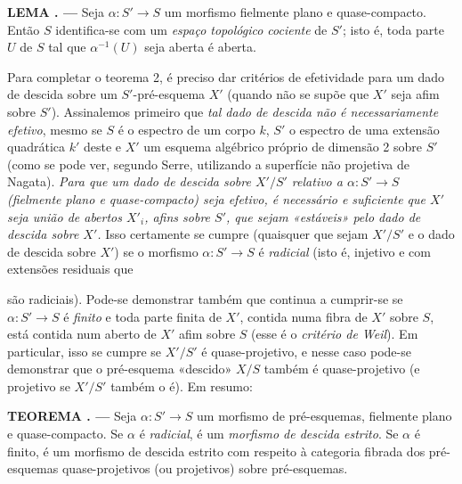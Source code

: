 \documentclass[11pt,twoside,openany]{book}
\numberwithin{equation}{section}
\newcommand{\src}[1]{%
  \phantomsection\hypertarget{src:#1}{}%
  \marginpar{\raggedleft\footnotesize\sffamily #1}%
}
\theoremstyle{plain}
\theoremstyle{definition}
\theoremstyle{remark}
\newcommand{\result}[2]{%
  \par\medskip\noindent\textbf{#1%
  \if\relax\detokenize{#2}\relax\else\space#2\fi. ---}\enspace
}
\newcommand{\FgaUnitKey}{frontmatter}
\renewcommand{\src}[1]{%
  \phantomsection\hypertarget{src:\FgaUnitKey:#1}{}%
  \marginpar{\raggedleft\footnotesize\sffamily #1}%
}
\begin{document}
\result{LEMA}{1.2} Seja $\alpha:S'\longrightarrow S$ um morfismo fielmente plano
e quase-compacto. Então $S$ identifica-se com um \emph{espaço topológico
cociente} de $S'$; isto é, toda parte $U$ de $S$ tal que
$\alpha^{-1}(U)$ seja aberta é aberta.

Para completar o teorema 2, é preciso dar critérios de efetividade para um dado
de descida sobre um $S'$-pré-esquema $X'$ (quando não se supõe que $X'$ seja
afim sobre $S'$). Assinalemos primeiro que \emph{tal dado de descida não é
necessariamente efetivo}, mesmo se $S$ é o espectro de um corpo $k$, $S'$
o espectro de uma extensão quadrática $k'$ deste e $X'$ um esquema
algébrico próprio de dimensão 2 sobre $S'$ (como se pode ver, segundo Serre,
utilizando a superfície não projetiva de Nagata). \emph{Para que um dado de
descida sobre $X'/S'$ relativo a $\alpha:S'\longrightarrow S$ (fielmente
plano e quase-compacto) seja efetivo, é necessário e suficiente que $X'$ seja
união de abertos $X'_i$, afins sobre $S'$, que sejam «estáveis» pelo dado de
descida sobre $X'$.} Isso certamente se cumpre (quaisquer que sejam $X'/S'$
e o dado de descida sobre $X'$) se o morfismo
$\alpha:S'\longrightarrow S$ é \emph{radicial} (isto é, injetivo e com
extensões residuais que

\src{318}
são radiciais). Pode-se demonstrar também que continua a cumprir-se se
$\alpha:S'\longrightarrow S$ é \emph{finito} e toda parte finita de $X'$,
contida numa fibra de $X'$ sobre $S$, está contida num aberto de $X'$
afim sobre $S$ (esse é o \emph{critério de Weil}). Em particular, isso se
cumpre se $X'/S'$ é quase-projetivo, e nesse caso pode-se demonstrar que o
pré-esquema «descido» $X/S$ também é quase-projetivo (e projetivo se
$X'/S'$ também o é). Em resumo:

\result{TEOREMA}{3} Seja $\alpha:S'\longrightarrow S$ um morfismo de
pré-esquemas, fielmente plano e quase-compacto. Se $\alpha$ é \emph{radicial},
é um \emph{morfismo de descida estrito}. Se $\alpha$ é finito, é um
morfismo de descida estrito com respeito à categoria fibrada dos
pré-esquemas quase-projetivos (ou projetivos) sobre pré-esquemas.
\end{document}
